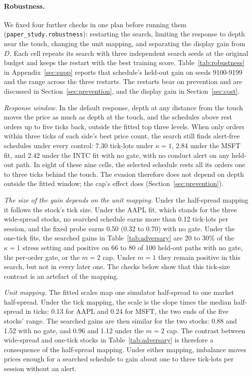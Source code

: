 \documentclass{article}
\begin{document}
\paragraph{Robustness.} We fixed four further checks in one plan before running them (\texttt{paper\_study.robustness}): restarting the search, limiting the response to depth near the touch, changing the unit mapping, and separating the display gain from $D$. Each cell repeats its search with three independent search seeds at the original budget and keeps the restart with the best training score. Table~\ref{tab:robustness} in Appendix~\ref{sec:supp} reports that schedule's held-out gain on seeds 9100-9199 and the range across the three restarts. The restarts bear on prevention and are discussed in Section~\ref{sec:prevention}, and the display gain in Section~\ref{sec:cost}.

\emph{Response window.} In the default response, depth at any distance from the touch moves the price as much as depth at the touch, and the schedules above rest orders up to five ticks back, outside the fitted top three levels. When only orders within three ticks of each side's best price count, the search still finds alert-free schedules under every control: 7.30 tick-lots under $\kappa = 1$, 2.84 under the MSFT fit, and 2.42 under the INTC fit with no gate, with no conduct alert on any held-out path. In eight of these nine cells, the selected schedule rests all its orders one to three ticks behind the touch. The evasion therefore does not depend on depth outside the fitted window; the cap's effect does (Section~\ref{sec:prevention}).

\emph{The size of the gain depends on the unit mapping.} Under the half-spread mapping it follows the stock's tick size. Under the AAPL fit, which stands for the three wide-spread stocks, no searched schedule earns more than 0.12 tick-lots per session, and the fixed probe earns 0.50 (0.32 to 0.70) with no gate. Under the one-tick fits, the searched gains in Table~\ref{tab:adversary} are 20 to 30\% of the $\kappa = 1$ stress setting and positive on 66 to 80 of 100 held-out paths with no gate, the per-order gate, or the $m = 2$ cap. Under $m = 1$ they remain positive in this search, but not in every later one. The checks below show that this tick-size contrast is an artefact of the mapping.

\emph{Unit mapping.} The fitted scales map one simulator half-spread to one market half-spread. Under the tick mapping, the scale is the slope times the median half-spread in ticks: 0.13 for AAPL and 0.24 for MSFT, the two ends of the five stocks' range. The searched gains are then similar for the two stocks: 0.88 and 1.52 with no gate, and 0.96 and 1.12 under the $m = 2$ cap. The contrast between wide-spread and one-tick stocks in Table~\ref{tab:adversary} is therefore a consequence of the half-spread mapping. Under either mapping, imbalance moves prices enough for a searched schedule to gain about one to three tick-lots per session without an alert.
\end{document}

